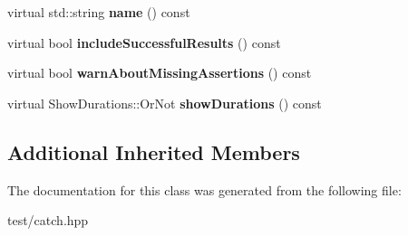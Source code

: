\begin{DoxyCompactItemize}
\item 
virtual std\+::string {\bfseries name} () const \hypertarget{classCatch_1_1Config_a740c0195e2935033b71e3c3eaf0220c9}{}\label{classCatch_1_1Config_a740c0195e2935033b71e3c3eaf0220c9}

\item 
virtual bool {\bfseries include\+Successful\+Results} () const \hypertarget{classCatch_1_1Config_aea5f577057289ee2113cbe5adf296e69}{}\label{classCatch_1_1Config_aea5f577057289ee2113cbe5adf296e69}

\item 
virtual bool {\bfseries warn\+About\+Missing\+Assertions} () const \hypertarget{classCatch_1_1Config_ab8fdb451c6e214a24e8ff538ffaaa7e5}{}\label{classCatch_1_1Config_ab8fdb451c6e214a24e8ff538ffaaa7e5}

\item 
virtual Show\+Durations\+::\+Or\+Not {\bfseries show\+Durations} () const \hypertarget{classCatch_1_1Config_a192ff42482ade89d8225fcc0851909fd}{}\label{classCatch_1_1Config_a192ff42482ade89d8225fcc0851909fd}

\end{DoxyCompactItemize}
\subsection*{Additional Inherited Members}


The documentation for this class was generated from the following file\+:\begin{DoxyCompactItemize}
\item 
test/catch.\+hpp\end{DoxyCompactItemize}
